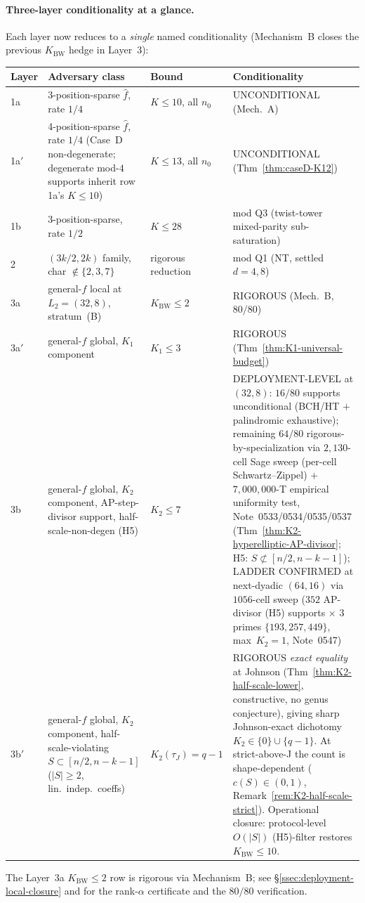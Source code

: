 \documentclass[11pt]{article}
\theoremstyle{definition}
\theoremstyle{remark}
\begin{document}
\paragraph{Three-layer conditionality at a glance.}
Each layer now reduces to a \emph{single} named conditionality
(Mechanism~B closes the previous $K_{\mathrm{BW}}$ hedge in Layer~3):
\begin{center}\small
\begin{tabular}{l l l l}
\toprule
Layer & Adversary class & Bound & Conditionality \\
\midrule
1a & 3-position-sparse $\hat f$, rate $1/4$ & $K \leq 10$, all $n_0$ & UNCONDITIONAL (Mech.~A) \\
1a$'$ & 4-position-sparse $\hat f$, rate $1/4$ (Case~D non-degenerate; degenerate mod-$4$ supports inherit row 1a's $K \leq 10$) & $K \leq 13$, all $n_0$ & UNCONDITIONAL (Thm~\ref{thm:caseD-K12}) \\
1b & 3-position-sparse, rate $1/2$ & $K \leq 28$ & mod Q3 (twist-tower mixed-parity sub-saturation) \\
2 & $(3k/2, 2k)$ family, char $\notin\{2,3,7\}$ & rigorous reduction & mod Q1 (NT, settled $d{=}4,8$) \\
3a & general-$f$ local at $L_2{=}(32,8)$, stratum~(B) & $K_{\mathrm{BW}} \leq 2$ & RIGOROUS (Mech.~B, $80/80$) \\
3a$'$ & general-$f$ global, $K_1$ component & $K_1 \leq 3$ & RIGOROUS (Thm~\ref{thm:K1-universal-budget}) \\
3b & general-$f$ global, $K_2$ component, AP-step-divisor support, half-scale-non-degen (H5) & $K_2 \leq 7$ & DEPLOYMENT-LEVEL at $(32,8)$: $16/80$ supports unconditional (BCH/HT $+$ palindromic exhaustive); remaining $64/80$ rigorous-by-specialization via $2{,}130$-cell Sage sweep (per-cell Schwartz--Zippel) $+$ $7{,}000{,}000$-T empirical uniformity test, Note~0533/0534/0535/0537 (Thm~\ref{thm:K2-hyperelliptic-AP-divisor}; H5: $S \not\subset [n/2, n{-}k{-}1]$); LADDER CONFIRMED at next-dyadic $(64,16)$ via $1056$-cell sweep ($352$ AP-divisor (H5) supports $\times$ $3$ primes $\{193, 257, 449\}$, max~$K_2=1$, Note~0547) \\
3b$'$ & general-$f$ global, $K_2$ component, half-scale-violating $S \subset [n/2, n{-}k{-}1]$ ($|S|\geq 2$, lin.~indep.~coeffs) & $\boxed{K_2(\tau_J) = q - 1}$ & RIGOROUS \emph{exact equality} at Johnson (Thm~\ref{thm:K2-half-scale-lower}, constructive, no genus conjecture), giving sharp Johnson-exact dichotomy $K_2 \in \{0\} \cup \{q-1\}$. At strict-above-J the count is shape-dependent ($c(S) \in (0, 1)$, Remark~\ref{rem:K2-half-scale-strict}). Operational closure: protocol-level $O(|S|)$ (H5)-filter restores $K_{\mathrm{BW}} \leq 10$. \\
\bottomrule
\end{tabular}
\end{center}
The Layer~3a $K_{\mathrm{BW}} \leq 2$ row is rigorous via
Mechanism~B; see \S\ref{ssec:deployment-local-closure} and
\cite{CompanionRepo} for the rank-$\alpha$ certificate and
the $80/80$ verification.
\end{document}
